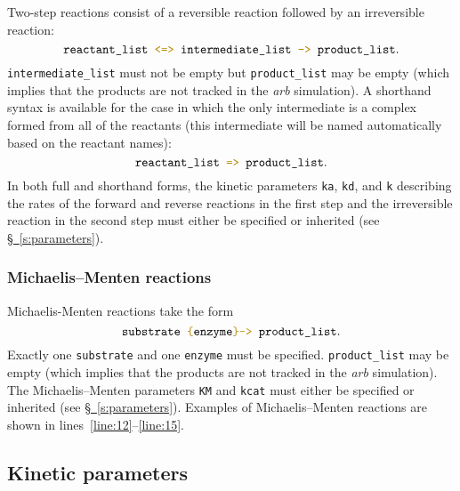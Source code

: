 \documentclass[fontsize=12pt,
               captions=abovetable,
               numbers=noenddot,
              ]{scrartcl}
\newcommand{\sect}[1]{\hyperref[s:#1]{\S~\ref{s:#1}}}
\newcommand{\syntax}[2]{\textcolor{#1}{\texttt{#2}}}
\newcommand{\lnums}[2]{lines~\ref{line:#1}--\ref{line:#2}}
\begin{document}
Two-step reactions consist of a reversible reaction followed by an irreversible reaction:
%
\begin{equation*}
\texttt{reactant\_list} \syntax{statement}{ <=> } \texttt{intermediate\_list} \syntax{statement}{ -> } \texttt{product\_list}.
\end{equation*}
%
\texttt{intermediate\_list} must not be empty but \texttt{product\_list} may be empty (which implies that the products are not tracked in the \emph{arb} simulation). A shorthand syntax is available for the case in which the only intermediate is a complex formed from all of the reactants (this intermediate will be named automatically based on the reactant names):
%
\begin{equation*}
\texttt{reactant\_list} \syntax{statement}{ => } \texttt{product\_list}.
\end{equation*}
%
In both full and shorthand forms, the kinetic parameters \syntax{function}{ka}, \syntax{function}{kd}, and \syntax{function}{k} describing the rates of the forward and reverse reactions in the first step and the irreversible reaction in the second step must either be specified or inherited (see \sect{parameters}).

\subsubsection{Michaelis--Menten reactions}

Michaelis-Menten reactions take the form
%
\begin{equation*}
\texttt{substrate} \syntax{statement}{ \char`\{}\texttt{enzyme}\syntax{statement}{\char`\}-> } \texttt{product\_list}.
\end{equation*}
%
Exactly one \texttt{substrate} and one \texttt{enzyme} must be specified. \texttt{product\_list} may be empty (which implies that the products are not tracked in the \emph{arb} simulation). The Michaelis--Menten parameters \syntax{function}{KM} and \syntax{function}{kcat} must either be specified or inherited (see \sect{parameters}). Examples of Michaelis--Menten reactions are shown in \lnums{12}{15}.

\subsection{Kinetic parameters \label{s:parameters}}
\end{document}
